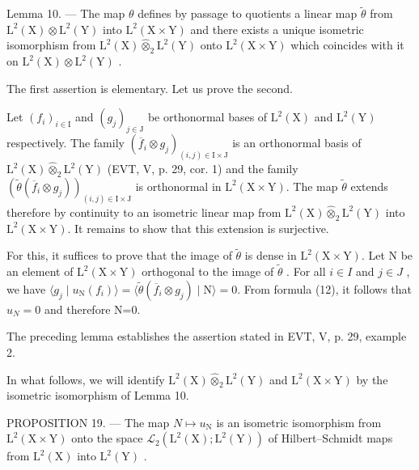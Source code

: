 Lemma 10. --- The map \(\theta\) defines by passage to quotients a linear map \(\widetilde{\theta}\) from \(\mathrm{L}^2 (\mathrm{X})\otimes \mathrm{L}^2 (\mathrm{Y})\) into \(\mathrm{L}^2 (\mathrm{X}\times \mathrm{Y})\) and there exists a unique isometric isomorphism from \(\mathrm{L}^2 (\mathrm{X})\widehat{\otimes}_2\mathrm{L}^2 (\mathrm{Y})\) onto \(\mathrm{L}^2 (\mathrm{X}\times \mathrm{Y})\) which coincides with it on \(\mathrm{L}^2 (\mathrm{X})\otimes \mathrm{L}^2 (\mathrm{Y})\) .

The first assertion is elementary. Let us prove the second.

Let \((f_i)_{i\in \mathrm{I}}\) and \((g_j)_{j\in \mathrm{J}}\) be orthonormal bases of \(\mathrm{L}^2 (\mathrm{X})\) and \(\mathrm{L}^2 (\mathrm{Y})\) respectively. The family \((\overline{f}_i\otimes g_j)_{(i,j)\in \mathrm{I}\times \mathrm{J}}\) is an orthonormal basis of \(\mathrm{L}^2 (\mathrm{X})\widehat{\otimes}_2\mathrm{L}^2 (\mathrm{Y})\) (EVT, V, p. 29, cor. 1) and the family \((\widetilde{\theta} (\overline{f}_i\otimes g_j))_{(i,j)\in \mathrm{I}\times \mathrm{J}}\) is orthonormal in \(\mathrm{L}^2 (\mathrm{X}\times \mathrm{Y})\). The map \(\widetilde{\theta}\) extends therefore by continuity to an isometric linear map from \(\mathrm{L}^2 (\mathrm{X})\widehat{\otimes}_2\mathrm{L}^2 (\mathrm{Y})\) into \(\mathrm{L}^2 (\mathrm{X}\times \mathrm{Y})\). It remains to show that this extension is surjective.

For this, it suffices to prove that the image of \(\widetilde{\theta}\) is dense in \(\mathrm{L}^{2}(\mathrm{X}\times\mathrm{Y})\). Let N be an element of \(\mathrm{L}^{2}(\mathrm{X}\times\mathrm{Y})\) orthogonal to the image of \(\widetilde{\theta}\) . For all \(i\in I\) and \(j\in J\) , we have \(\langle g_{j}\mid u_{\mathrm{N}}(f_{i})\rangle=\langle\widetilde{\theta}(\overline{f}_{i}\otimes g_{j})\mid\mathrm{N}\rangle=0\). From formula (12), it follows that \(u_{N}=0\) and therefore N=0.

The preceding lemma establishes the assertion stated in EVT, V, p. 29, example 2.

In what follows, we will identify \(\mathrm{L}^{2}(\mathrm{X})\widehat{\otimes}_{2}\mathrm{L}^{2}(\mathrm{Y})\) and \(\mathrm{L}^{2}(\mathrm{X}\times\mathrm{Y})\) by the isometric isomorphism of Lemma 10.

PROPOSITION 19. --- The map \(N\mapsto u_{\mathrm{N}}\) is an isometric isomorphism from \(\mathrm{L}^{2}(\mathrm{X}\times\mathrm{Y})\) onto the space \(\mathcal{L}_{2}(\mathrm{L}^{2}(\mathrm{X});\mathrm{L}^{2}(\mathrm{Y}))\) of Hilbert--Schmidt maps from \(\mathrm{L}^{2}(\mathrm{X})\) into \(\mathrm{L}^{2}(\mathrm{Y})\) .

